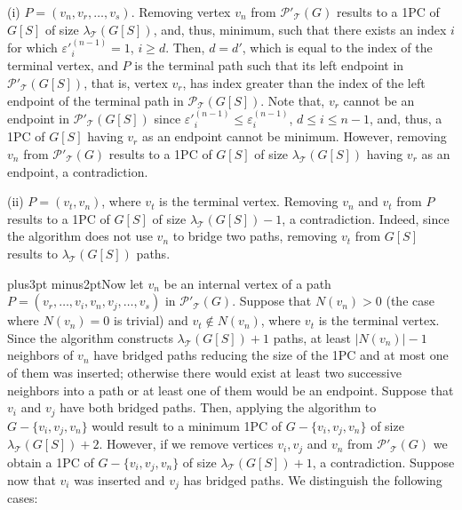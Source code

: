 \documentclass[10pt]{article}
\def\yskip{\penalty-50\vskip3pt plus3pt minus2pt}
\def\y{\yskip}
\begin{document}
{(i) $P=(v_n, v_r, \ldots, v_s)$. Removing vertex $v_n$ from
$\mathcal{P'_{\mathcal{T}}}(G)$ results to a 1PC of $G[S]$ of size
$\lambda_\mathcal{T}(G[S])$, and, thus, minimum, such that there
exists an index $i$ for which $\varepsilon'^{(n-1)}_i=1$, $i \geq
d$. Then, $d=d'$, which is equal to the index of the terminal
vertex, and $P$ is the terminal path such that its left endpoint
in $\mathcal{P'_{\mathcal{T}}}(G[S])$, that is, vertex $v_r$, has
index greater than the index of the left endpoint of the terminal
path in $\mathcal{P_{\mathcal{T}}}(G[S])$. Note that, $v_r$ cannot
be an endpoint in $\mathcal{P'_{\mathcal{T}}}(G[S])$ since
$\varepsilon'^{(n-1)}_i \leq \varepsilon^{(n-1)}_i$, $d \leq i
\leq n-1$, and, thus, a 1PC of $G[S]$ having $v_r$ as an endpoint
cannot be minimum. However, removing $v_n$ from
$\mathcal{P'_{\mathcal{T}}}(G)$ results to a 1PC of $G[S]$ of size
$\lambda_\mathcal{T}(G[S])$ having $v_r$ as an endpoint, a
contradiction.

(ii) $P=(v_t, v_n)$, where $v_t$ is the terminal vertex. Removing
$v_n$ and $v_t$ from $P$ results to a 1PC of $G[S]$ of size
$\lambda_\mathcal{T}(G[S])-1$, a contradiction. Indeed, since the
algorithm does not use $v_n$ to bridge two paths, removing $v_t$
from $G[S]$ results to $\lambda_\mathcal{T}(G[S])$ paths.

\y Now let $v_n$ be an internal vertex of a path $P=(v_r, \ldots,
v_i, v_n, v_j, \ldots, v_s)$ in $\mathcal{P'_{\mathcal{T}}}(G)$.
Suppose that $N(v_n)>0$ (the case where $N(v_n)=0$ is trivial) and
$v_t \notin N(v_n)$, where $v_t$ is the terminal vertex. Since the
algorithm constructs $\lambda_\mathcal{T}(G[S])+1$ paths, at least
$|N(v_n)|-1$ neighbors of $v_n$ have bridged paths reducing the
size of the 1PC and at most one of them was inserted; otherwise
there would exist at least two successive neighbors into a path or
at least one of them would be an endpoint. Suppose that $v_i$ and
$v_j$ have both bridged paths. Then, applying the algorithm to
$G-\{v_i,v_j,v_n\}$ would result to a minimum 1PC of
$G-\{v_i,v_j,v_n\}$ of size $\lambda_\mathcal{T}(G[S])+2$.
However, if we remove vertices $v_i, v_j$ and $v_n$ from
$\mathcal{P'_{\mathcal{T}}}(G)$ we obtain a 1PC of
$G-\{v_i,v_j,v_n\}$ of size $\lambda_\mathcal{T}(G[S])+1$, a
contradiction. Suppose now that $v_i$ was inserted and $v_j$ has
bridged paths. We distinguish the following cases:

}
\end{document}
